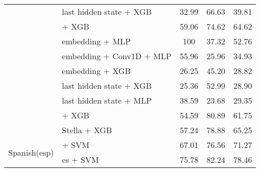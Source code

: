 \begin{longtable}{llccc}
                                          & \citep{DBLP:journals/corr/abs-1907-11692} last hidden state + XGB      & 32.99                                & 66.63              & 39.81             \\
                                          & \citep{ni2021sentencet5scalablesentenceencoders} + XGB                 & 59.06                                & 74.62              & 64.62             \\
                                          & \citep{DBLP:journals/corr/abs-1911-02116} embedding + MLP              & 100                                  & 37.32              & 52.76             \\
                                          & \citep{DBLP:journals/corr/abs-1911-02116} embedding + Conv1D + MLP     & 55.96                                & 25.96              & 34.93             \\
                                          & \citep{DBLP:journals/corr/abs-1911-02116} embedding + XGB              & 26.25                                & 45.20              & 28.82             \\
                                          & \citep{DBLP:journals/corr/abs-1911-02116} last hidden state + XGB      & 25.36                                & 52.99              & 28.90             \\
                                          & \citep{DBLP:journals/corr/abs-1911-02116} last hidden state + MLP      & 38.59                                & 23.68              & 29.35             \\
                                          & \citep{lee2024nv} + XGB                                                & 54.59                                & 80.89              & 61.75             \\
                                          & \citep{zhang2025jasperstelladistillationsota} Stella + XGB             & 57.24                                & 78.88              & 65.25             \\
    \midrule
    \multirow{6}{*}{Spanish(esp)}         & \citep{CaneteCFP2020}  + SVM                                           & 67.01                                & 76.56              & 71.27             \\
                                          & \citep{mohr2024multi} es + SVM                                         & 75.78                                & 82.24              & 78.46             \\

\end{longtable}

